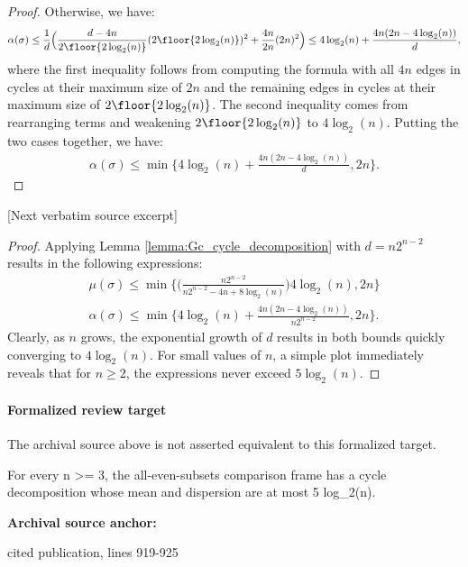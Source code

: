 \documentclass[10pt]{article}
\begin{document}
\begin{ReviewVerbatim}
\begin{proof}
			Otherwise, we have:
			\begin{align*}
			\alpha(\sigma) \leq \frac{1}{d} \Big(\frac{d - 4n}{2\floor{2 \log_2(n)}}(2\floor{2 \log_2(n)})^2 + \frac{4n}{2n}(2n)^2 \Big) \leq 4 \log_2(n) + \frac{4n(2n - 4 \log_2(n))}{d},
			\end{align*}
			where the first inequality follows from computing the formula with all $4n$ edges in cycles at their maximum size of $2n$ and the remaining edges in cycles at their maximum size of $2\floor{2 \log_2(n)}$. The second inequality comes from rearranging terms and weakening $2\floor{2 \log_2(n)}$ to $4 \log_2(n)$. Putting the two cases together, we have:
			\begin{align*}
			\alpha(\sigma) \leq \min \Big\{4 \log_2(n) + \frac{4n(2n - 4 \log_2(n))}{d}, 2n\Big\}.
			\end{align*}
		\end{proof}

[Next verbatim source excerpt]

		\begin{proof}
			Applying Lemma \ref{lemma:Gc_cycle_decomposition} with $d = n2^{n-2}$ results in the following expressions:
			\begin{align*}
			\mu(\sigma) \leq \min \Big\{\Big(\frac{n2^{n-2}}{n2^{n-2} - 4n + 8\log_2 (n)}\Big)4\log_2 (n), 2n\Big\} \\
			\alpha(\sigma) \leq \min \Big\{4 \log_2(n) + \frac{4n(2n - 4 \log_2(n))}{n2^{n-2}}, 2n\Big\}.
			\end{align*}
			Clearly, as $n$ grows, the exponential growth of $d$ results in both bounds quickly converging to $4 \log_2(n)$. For small values of $n$, a simple plot immediately reveals that for $n \geq 2$, the expressions never exceed $5 \log_2(n)$.
		\end{proof}
\end{ReviewVerbatim}


\paragraph{Formalized review target}
The archival source above is not asserted equivalent to this formalized target.
\begin{ReviewVerbatim}
For every n >= 3, the all-even-subsets comparison frame has a cycle decomposition whose mean and dispersion are at most 5 log_2(n).
\end{ReviewVerbatim}

\textbf{Archival source anchor:} {\footnotesize\raggedright cited publication, lines 919-\allowbreak{}925\par}
\end{document}
